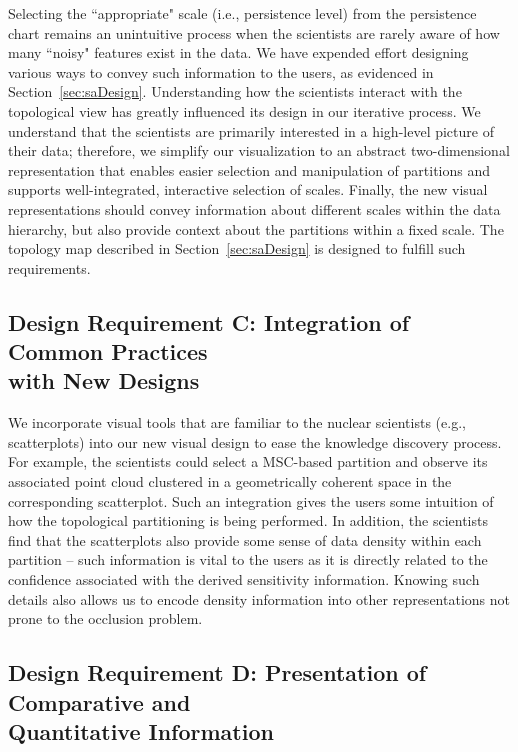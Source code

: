 Selecting the ``appropriate" scale (i.e., persistence level) from the persistence chart remains an unintuitive process when the scientists are rarely aware of how many ``noisy" features exist in the data. We have expended effort designing various ways to convey such information to the users, as evidenced in Section~\ref{sec:saDesign}.
%
Understanding how the scientists interact with the topological view has greatly influenced its design in our iterative process.
%
We understand that the scientists are primarily interested in a high-level picture of their data; therefore, we simplify our visualization to an abstract two-dimensional representation that enables easier selection and manipulation of partitions and supports well-integrated, interactive selection of scales.
%
Finally, the new visual representations should convey information about different scales within the data hierarchy, but also provide context about the
partitions within a fixed scale.
%
The topology map described in Section~\ref{sec:saDesign} is designed to fulfill such requirements.

\subsection{Design Requirement C: Integration of Common Practices\\with New Designs}

We incorporate visual tools that are familiar to the nuclear scientists (e.g., scatterplots) into our new visual design to ease the knowledge discovery process.
%
For example, the scientists could select a MSC-based partition and observe its associated point cloud clustered in a geometrically coherent space in the corresponding scatterplot.
%
Such an integration gives the users some intuition of how the topological partitioning is being performed.
%
In addition, the scientists find that the scatterplots also provide some sense of data density within each partition -- such information is vital to the users as it is directly related to the confidence associated with the derived sensitivity information.
%
Knowing such details also allows us to encode density information into other representations not prone to the occlusion problem.

\subsection{Design Requirement D: Presentation of Comparative and\\Quantitative Information}


